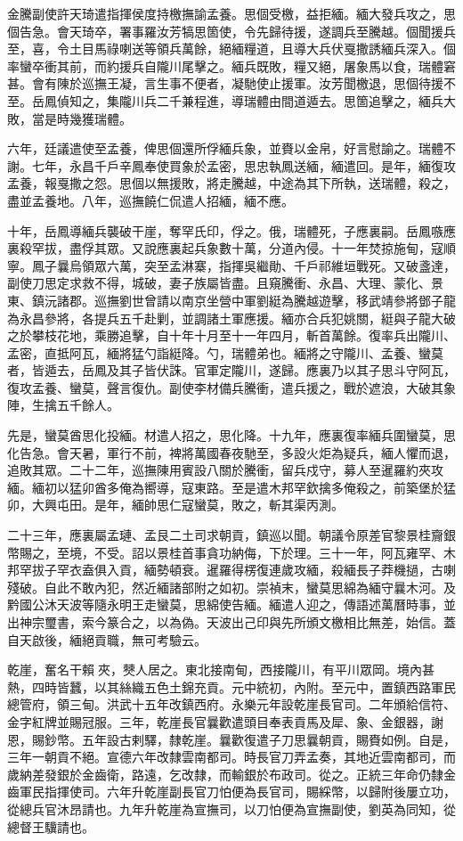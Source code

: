 \begin{pinyinscope}
金騰副使許天琦遣指揮侯度持檄撫諭孟養。思個受檄，益拒緬。緬大發兵攻之，思個告急。會天琦卒，署事羅汝芳犒思箇使，令先歸待援，遂調兵至騰越。個聞援兵至，喜，令土目馬祿喇送等領兵萬餘，絕緬糧道，且導大兵伏戛撒誘緬兵深入。個率蠻卒衝其前，而約援兵自隴川尾擊之。緬兵既敗，糧又絕，屠象馬以食，瑞體窘甚。會有陳於巡撫王凝，言生事不便者，凝馳使止援軍。汝芳聞檄退，思個待援不至。岳鳳偵知之，集隴川兵二千兼程進，導瑞體由間道遁去。思箇追擊之，緬兵大敗，當是時幾獲瑞體。

六年，廷議遣使至孟養，俾思個還所俘緬兵象，並賚以金帛，好言慰諭之。瑞體不謝。七年，永昌千戶辛鳳奉使買象於孟密，思忠執鳳送緬，緬遣回。是年，緬復攻孟養，報戛撒之怨。思個以無援敗，將走騰越，中途為其下所執，送瑞體，殺之，盡並孟養地。八年，巡撫饒仁侃遣人招緬，緬不應。

十年，岳鳳導緬兵襲破干崖，奪罕氏印，俘之。俄，瑞體死，子應裏嗣。岳鳳嗾應裏殺罕拔，盡俘其眾。又說應裏起兵象數十萬，分道內侵。十一年焚掠施甸，寇順寧。鳳子曩烏領眾六萬，突至孟淋寨，指揮吳繼勛、千戶祁維垣戰死。又破盞達，副使刀思定求救不得，城破，妻子族屬皆盡。且窺騰衝、永昌、大理、蒙化、景東、鎮沅諸郡。巡撫劉世曾請以南京坐營中軍劉綎為騰越遊擊，移武靖參將鄧子龍為永昌參將，各提兵五千赴剿，並調諸土軍應援。緬亦合兵犯姚關，綎與子龍大破之於攀枝花地，乘勝追擊，自十年十月至十一年四月，斬首萬餘。復率兵出隴川、孟密，直抵阿瓦，緬將猛勺詣綎降。勺，瑞體弟也。緬將之守隴川、孟養、蠻莫者，皆遁去，岳鳳及其子皆伏誅。官軍定隴川，遂歸。應裏乃以其子思斗守阿瓦，復攻孟養、蠻莫，聲言復仇。副使李材備兵騰衝，遣兵援之，戰於遮浪，大破其象陣，生擒五千餘人。

先是，蠻莫酋思化投緬。材遣人招之，思化降。十九年，應裏復率緬兵圍蠻莫，思化告急。會天暑，軍行不前，裨將萬國春夜馳至，多設火炬為疑兵，緬人懼而退，追敗其眾。二十二年，巡撫陳用賓設八關於騰衝，留兵戍守，募人至暹羅約夾攻緬。緬初以猛卯酋多俺為嚮導，寇東路。至是遣木邦罕欽擒多俺殺之，前築堡於猛卯，大興屯田。是年，緬帥思仁寇蠻莫，敗之，斬其渠丙測。

二十三年，應裏屬孟璉、孟艮二土司求朝貢，鎮巡以聞。朝議令原差官黎景桂齎銀幣賜之，至境，不受。詔以景桂首事貪功納侮，下於理。三十一年，阿瓦雍罕、木邦罕拔子罕衣盍俱入貢，緬勢頓衰。暹羅得楞復連歲攻緬，殺緬長子莽機撾，古喇殘破。自此不敢內犯，然近緬諸部附之如初。崇禎末，蠻莫思綿為緬守曩木河。及黔國公沐天波等隨永明王走蠻莫，思綿使告緬。緬遣人迎之，傳語述萬曆時事，並出神宗璽書，索今篆合之，以為偽。天波出己印與先所頒文檄相比無差，始信。蓋自天啟後，緬絕貢職，無可考驗云。

乾崖，奮名干賴夾，僰人居之。東北接南甸，西接隴川，有平川眾岡。境內甚熱，四時皆蠶，以其絲織五色土錦充貢。元中統初，內附。至元中，置鎮西路軍民總管府，領三甸。洪武十五年改鎮西府。永樂元年設乾崖長官司。二年頒給信符、金字紅牌並賜冠服。三年，乾崖長官曩歡遣頭目奉表貢馬及犀、象、金銀器，謝恩，賜鈔幣。五年設古剌驛，隸乾崖。曩歡復遣子刀思曩朝貢，賜賚如例。自是，三年一朝貢不絕。宣德六年改隸雲南都司。時長官刀弄孟奏，其地近雲南都司，而歲納差發銀於金齒衛，路遠，乞改隸，而輸銀於布政司。從之。正統三年命仍隸金齒軍民指揮使司。六年升乾崖副長官刀怕便為長官司，賜綵幣，以歸附後屢立功，從總兵官沐昂請也。九年升乾崖為宣撫司，以刀怕便為宣撫副使，劉英為同知，從總督王驥請也。


\end{pinyinscope}
